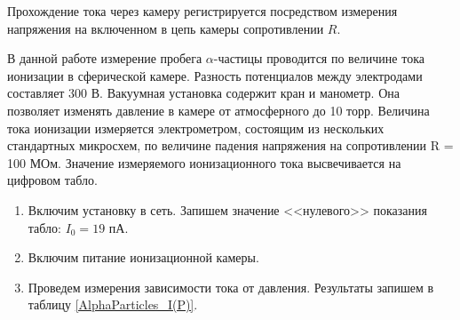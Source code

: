 	Прохождение тока через камеру регистрируется посредством измерения напряжения на включенном в цепь камеры сопротивлении $R$.

	В данной работе измерение пробега $\alpha$-частицы проводится по величине тока ионизации в сферической камере. Разность потенциалов между электродами составляет 300 В. Вакуумная установка содержит кран и манометр. Она позволяет изменять давление в камере от атмосферного до 10 торр. Величина тока ионизации измеряется электрометром, состоящим из нескольких стандартных микросхем, по величине падения напряжения на сопротивлении R = 100 МОм. Значение измеряемого ионизационного тока высвечивается на цифровом табло.

	
	\begin{enumerate}
		\item Включим установку в сеть. Запишем значение <<нулевого>> показания табло: $I_0 = 19$ пА.
		
		\item Включим питание ионизационной камеры.
		
		\item Проведем измерения зависимости тока от давления. Результаты запишем в таблицу \ref{AlphaParticles_I(P)}.
	

\end{enumerate}
